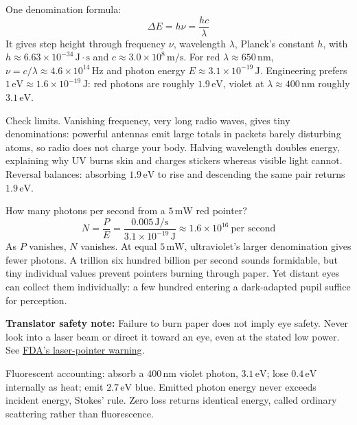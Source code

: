 \begin{mainline}
One denomination formula:
\[
\Delta E=h\nu=\frac{hc}{\lambda}
\]
It gives step height through frequency \(\nu\), wavelength \(\lambda\), Planck's constant \(h\), with \(h\approx 6.63\times10^{-34}\,\mathrm{J\cdot s}\) and \(c\approx 3.0\times10^{8}\,\mathrm{m/s}\). For red \(\lambda\approx 650\,\mathrm{nm}\), \(\nu=c/\lambda\approx 4.6\times10^{14}\,\mathrm{Hz}\) and photon energy \(E\approx 3.1\times10^{-19}\,\mathrm{J}\). Engineering prefers \(1\,\mathrm{eV}\approx 1.6\times10^{-19}\,\mathrm{J}\): red photons are roughly \(1.9\,\mathrm{eV}\), violet at \(\lambda\approx 400\,\mathrm{nm}\) roughly \(3.1\,\mathrm{eV}\).

Check limits. Vanishing frequency, very long radio waves, gives tiny denominations: powerful antennas emit large totals in packets barely disturbing atoms, so radio does not charge your body. Halving wavelength doubles energy, explaining why UV burns skin and charges stickers whereas visible light cannot. Reversal balances: absorbing \(1.9\,\mathrm{eV}\) to rise and descending the same pair returns \(1.9\,\mathrm{eV}\).

How many photons per second from a \(5\,\mathrm{mW}\) red pointer?
\[
N=\frac{P}{E}=\frac{0.005\,\mathrm{J/s}}{3.1\times10^{-19}\,\mathrm{J}}\approx 1.6\times10^{16}\ \text{per second}
\]
As \(P\) vanishes, \(N\) vanishes. At equal \(5\,\mathrm{mW}\), ultraviolet's larger denomination gives fewer photons. A trillion six hundred billion per second sounds formidable, but tiny individual values prevent pointers burning through paper. Yet distant eyes can collect them individually: a few hundred entering a dark-adapted pupil suffice for perception.

\textbf{Translator safety note:} Failure to burn paper does not imply eye safety. Never look into a laser beam or direct it toward an eye, even at the stated low power. See \href{https://www.fda.gov/radiation-emitting-products/alerts-and-notices/illuminating-facts-about-laser-pointers}{FDA's laser-pointer warning}.

Fluorescent accounting: absorb a \(400\,\mathrm{nm}\) violet photon, \(3.1\,\mathrm{eV}\); lose \(0.4\,\mathrm{eV}\) internally as heat; emit \(2.7\,\mathrm{eV}\) blue. Emitted photon energy never exceeds incident energy, Stokes' rule. Zero loss returns identical energy, called ordinary scattering rather than fluorescence.
\end{mainline}

